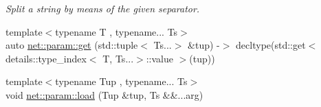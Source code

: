 \begin{DoxyCompactItemize}
\begin{DoxyCompactList}\small\item\em Split a string by means of the given separator. \end{DoxyCompactList}\item 
{\footnotesize template$<$typename T , typename... Ts$>$ }\\auto \hyperlink{namespacenet_1_1param_a9020a1d5f00da972acbea3e809d3c602}{net\+::param\+::get} (std\+::tuple$<$ Ts...$>$ \&tup) -\/$>$ decltype(std\+::get$<$ details\+::type\+\_\+index$<$ T, Ts...$>$\+::value $>$(tup))
\item 
{\footnotesize template$<$typename Tup , typename... Ts$>$ }\\void \hyperlink{namespacenet_1_1param_aef5f360e345f5ab876c171a76a0777a2}{net\+::param\+::load} (Tup \&tup, Ts \&\&...arg)
\end{DoxyCompactItemize}
